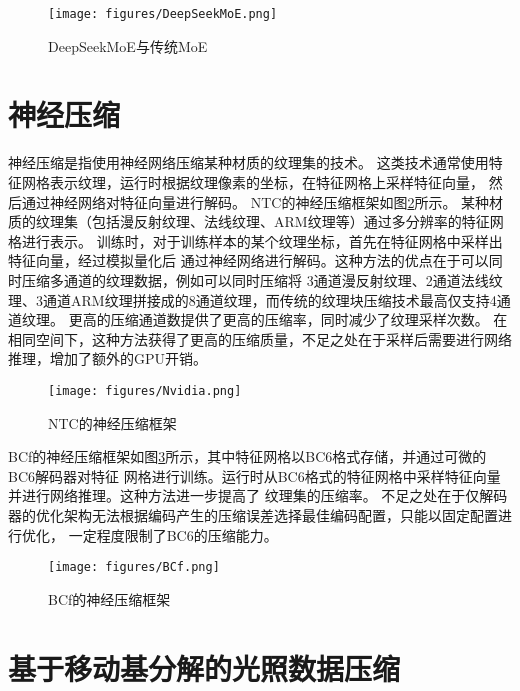 \begin{figure}[htbp]
    \centering
    \texttt{[image: figures/DeepSeekMoE.png]}
    \caption{DeepSeekMoE与传统MoE\cite{dai2024deepseekmoe}}
    \label{fig:DeepSeekMoE}
\end{figure}

\section{神经压缩}

神经压缩是指使用神经网络压缩某种材质的纹理集的技术。
这类技术通常使用特征网格表示纹理，运行时根据纹理像素的坐标，在特征网格上采样特征向量，
然后通过神经网络对特征向量进行解码。
NTC\cite{vaidyanathan2023random}的神经压缩框架如图\ref{fig:Nvidia}所示。
某种材质的纹理集（包括漫反射纹理、法线纹理、ARM纹理等）通过多分辨率的特征网格进行表示。
训练时，对于训练样本的某个纹理坐标，首先在特征网格中采样出特征向量，经过模拟量化后
通过神经网络进行解码。这种方法的优点在于可以同时压缩多通道的纹理数据，例如可以同时压缩将
3通道漫反射纹理、2通道法线纹理、3通道ARM纹理拼接成的8通道纹理，而传统的纹理块压缩技术最高仅支持4通道纹理。
更高的压缩通道数提供了更高的压缩率，同时减少了纹理采样次数。
在相同空间下，这种方法获得了更高的压缩质量，不足之处在于采样后需要进行网络推理，增加了额外的GPU开销。

\begin{figure}[htbp]
    \centering
    \texttt{[image: figures/Nvidia.png]}
    \caption{NTC的神经压缩框架\cite{vaidyanathan2023random}}
    \label{fig:Nvidia}
\end{figure}

BCf\cite{weinreich2024real}的神经压缩框架如图\ref{fig:BCf}所示，其中特征网格以BC6格式存储，并通过可微的BC6解码器对特征
网格进行训练。运行时从BC6格式的特征网格中采样特征向量并进行网络推理。这种方法进一步提高了
纹理集的压缩率。
不足之处在于仅解码器的优化架构无法根据编码产生的压缩误差选择最佳编码配置，只能以固定配置进行优化，
一定程度限制了BC6的压缩能力。

\begin{figure}[htbp]
    \centering
    \texttt{[image: figures/BCf.png]}
    \caption{BCf的神经压缩框架\cite{weinreich2024real}}
    \label{fig:BCf}
\end{figure}


\section{基于移动基分解的光照数据压缩}

